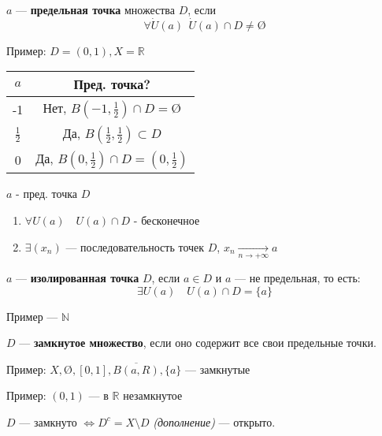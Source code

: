 \begin{definition}
    $a$ --- {\bf предельная точка} множества $D$, если $$\forall \dot U(a) \ \ \dot U(a)\cap D\not = \text{\O}$$
\end{definition}

Пример: $D=(0,1), X=\mathbb{R}$

\begin{tabular}{c|c}
    $a$&Пред. точка? \\
    \hline
    -1& Нет, $B(-1, \frac{1}{2})\cap D=\text{\O}$\\
    \hline
    $\frac{1}{2}$ & Да, $B(\frac{1}{2}, \frac{1}{2})\subset D$\\
    \hline
    0 & Да, $B(0,\frac{1}{2})\cap D = (0, \frac{1}{2})$
\end{tabular}

\begin{remark}
    $a$ - пред. точка $D$
    \begin{enumerate}
        \item $\forall U(a) \quad U(a)\cap D$ - бесконечное
        \item $\exists (x_n)$ --- последовательность точек $D$, $x_n\underset{n\to +\infty}\to a$
    \end{enumerate}
\end{remark}

\begin{definition}
    $a$ --- \textbf{изолированная точка} $D$, если $a\in D$ и $a$ --- не предельная, то есть:
    $$\exists U(a) \quad U(a)\cap D = \{a\}$$
\end{definition}

Пример --- $\mathbb{N}$

\begin{definition}
    $D$ --- \textbf{замкнутое множество}, если оно содержит все свои предельные точки.
\end{definition}

Пример: $X, \text{\O}, [0,1], \overline{B(a,R)}, \{a\}$ --- замкнутые

Пример: $(0, 1)$ --- в $\mathbb{R}$ незамкнутое

\begin{theorem}
    $D$ --- замкнуто $\Leftrightarrow D^c=X\setminus D$ \textit{(дополнение)} --- открыто.
\end{theorem}

